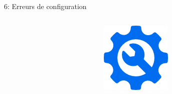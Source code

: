 \documentclass[final,hyperref={pdfpagelabels=false}]{beamer}
\begin{document}
\begin{frame}[t]
\begin{columns}[t]
\begin{column}{.465\textwidth}
	\begin{block}{6: Erreurs de configuration}
		\begin{columns}[T]

			\begin{column}{.01\textwidth}
			\end{column}
			\begin{column}{.115\textwidth} %
				\includegraphics[scale=1.35]{cog.png}
			\end{column}


\end{columns}
\end{block}
\end{column}
\end{columns}
\end{frame}
\end{document}

